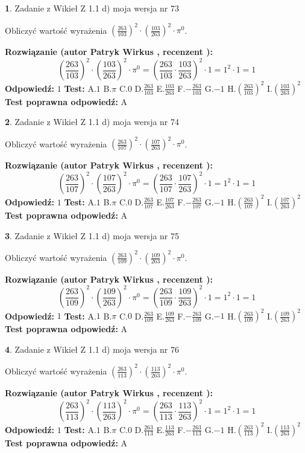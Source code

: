 \documentclass[12pt, a4paper]{article}
\theoremstyle{definition} %
\newtheorem{zad}{}
\newcommand{\zadStart}[1]{\begin{zad}#1\newline}
\newcommand{\zadStop}{\end{zad}}
\newcommand{\rozwStart}[2]{\noindent \textbf{Rozwiązanie (autor #1 , recenzent #2): }\newline}
\newcommand{\rozwStop}{\newline}
\newcommand{\odpStart}{\noindent \textbf{Odpowiedź:}\newline}
\newcommand{\odpStop}{\newline}
\newcommand{\testStart}{\noindent \textbf{Test:}\newline}
\newcommand{\testStop}{\newline}
\newcommand{\kluczStart}{\noindent \textbf{Test poprawna odpowiedź:}\newline}
\newcommand{\kluczStop}{\newline}
\begin{document}
\zadStart{Zadanie z Wikieł Z 1.1 d) moja wersja nr 73}

Obliczyć wartość wyrażenia $(\frac{263}{103})^{2} \cdot (\frac{103}{263})^{2} \cdot \pi^{0}$.
\zadStop
\rozwStart{Patryk Wirkus}{}
$$(\frac{263}{103})^{2} \cdot (\frac{103}{263})^{2} \cdot \pi^{0} = (\frac{263}{103} \cdot \frac{103}{263})^{2} \cdot 1 = 1^{2} \cdot 1 = 1$$
\rozwStop
\odpStart
$1$
\odpStop
\testStart
A.$1$ B.$\pi$ C.$0$ D.$\frac{263}{103}$ E.$\frac{103}{263}$
F.$-\frac{263}{103}$ G.$-1$
H.$(\frac{263}{103})^{2}$
I.$(\frac{103}{263})^{2}$
\testStop
\kluczStart
A
\kluczStop



\zadStart{Zadanie z Wikieł Z 1.1 d) moja wersja nr 74}

Obliczyć wartość wyrażenia $(\frac{263}{107})^{2} \cdot (\frac{107}{263})^{2} \cdot \pi^{0}$.
\zadStop
\rozwStart{Patryk Wirkus}{}
$$(\frac{263}{107})^{2} \cdot (\frac{107}{263})^{2} \cdot \pi^{0} = (\frac{263}{107} \cdot \frac{107}{263})^{2} \cdot 1 = 1^{2} \cdot 1 = 1$$
\rozwStop
\odpStart
$1$
\odpStop
\testStart
A.$1$ B.$\pi$ C.$0$ D.$\frac{263}{107}$ E.$\frac{107}{263}$
F.$-\frac{263}{107}$ G.$-1$
H.$(\frac{263}{107})^{2}$
I.$(\frac{107}{263})^{2}$
\testStop
\kluczStart
A
\kluczStop



\zadStart{Zadanie z Wikieł Z 1.1 d) moja wersja nr 75}

Obliczyć wartość wyrażenia $(\frac{263}{109})^{2} \cdot (\frac{109}{263})^{2} \cdot \pi^{0}$.
\zadStop
\rozwStart{Patryk Wirkus}{}
$$(\frac{263}{109})^{2} \cdot (\frac{109}{263})^{2} \cdot \pi^{0} = (\frac{263}{109} \cdot \frac{109}{263})^{2} \cdot 1 = 1^{2} \cdot 1 = 1$$
\rozwStop
\odpStart
$1$
\odpStop
\testStart
A.$1$ B.$\pi$ C.$0$ D.$\frac{263}{109}$ E.$\frac{109}{263}$
F.$-\frac{263}{109}$ G.$-1$
H.$(\frac{263}{109})^{2}$
I.$(\frac{109}{263})^{2}$
\testStop
\kluczStart
A
\kluczStop



\zadStart{Zadanie z Wikieł Z 1.1 d) moja wersja nr 76}

Obliczyć wartość wyrażenia $(\frac{263}{113})^{2} \cdot (\frac{113}{263})^{2} \cdot \pi^{0}$.
\zadStop
\rozwStart{Patryk Wirkus}{}
$$(\frac{263}{113})^{2} \cdot (\frac{113}{263})^{2} \cdot \pi^{0} = (\frac{263}{113} \cdot \frac{113}{263})^{2} \cdot 1 = 1^{2} \cdot 1 = 1$$
\rozwStop
\odpStart
$1$
\odpStop
\testStart
A.$1$ B.$\pi$ C.$0$ D.$\frac{263}{113}$ E.$\frac{113}{263}$
F.$-\frac{263}{113}$ G.$-1$
H.$(\frac{263}{113})^{2}$
I.$(\frac{113}{263})^{2}$
\testStop
\kluczStart
A
\kluczStop
\end{document}
